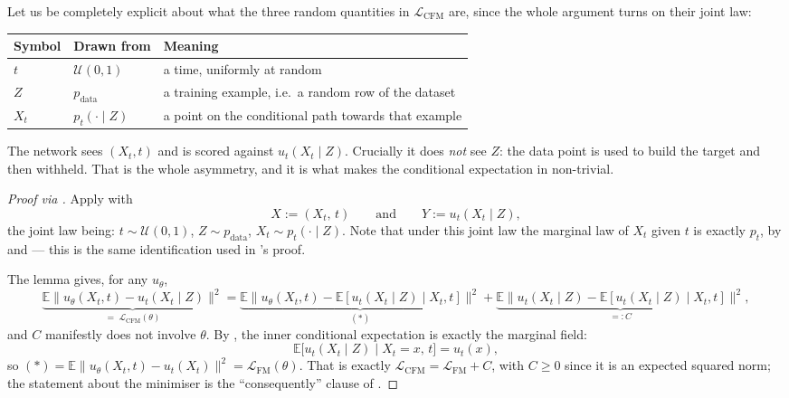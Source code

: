 \documentclass[11pt,a4paper]{report}
\theoremstyle{definition}
\theoremstyle{remark}
\newcommand{\EE}{\mathbb E}
\begin{document}
Let us be completely explicit about what the three random quantities in
$\mathcal L_{\mathrm{CFM}}$ are, since the whole argument turns on their
joint law:

\begin{center}
\begin{tabular}{llp{7.4cm}}
\toprule
Symbol & Drawn from & Meaning \\
\midrule
$t$ & $\mathcal U(0,1)$ & a time, uniformly at random \\
$Z$ & $p_{\mathrm{data}}$ & a training example, i.e.\ a random row of the dataset \\
$X_t$ & $p_t(\cdot\mid Z)$ & a point on the conditional path towards that example \\
\bottomrule
\end{tabular}
\end{center}

The network sees $(X_t,t)$ and is scored against $u_t(X_t\mid Z)$. Crucially
it does \emph{not} see $Z$: the data point is used to build the target and
then withheld. That is the whole asymmetry, and it is what makes the
conditional expectation in  non-trivial.

\begin{proof}[Proof via ]
Apply  with
\[
X := (X_t,\,t)
\qquad\text{and}\qquad
Y := u_t(X_t\mid Z) ,
\]
the joint law being: $t\sim\mathcal U(0,1)$, $Z\sim p_{\mathrm{data}}$,
$X_t\sim p_t(\cdot\mid Z)$. Note that under this joint law the marginal law
of $X_t$ given $t$ is exactly $p_t$, by  and
 --- this is the same identification used in
's proof.

The lemma gives, for any $u_\theta$,
\[
\underbrace{\EE\bigl\|u_\theta(X_t,t)-u_t(X_t\mid Z)\bigr\|^2}_{=\;\mathcal L_{\mathrm{CFM}}(\theta)}
=
\underbrace{\EE\bigl\|u_\theta(X_t,t)-\EE[u_t(X_t\mid Z)\mid X_t,t]\bigr\|^2}_{(\ast)}
+
\underbrace{\EE\bigl\|u_t(X_t\mid Z)-\EE[u_t(X_t\mid Z)\mid X_t,t]\bigr\|^2}_{=:C} ,
\]
and $C$ manifestly does not involve $\theta$. By
, the inner conditional expectation is
exactly the marginal field:
\[
\EE\bigl[u_t(X_t\mid Z)\;\big|\;X_t=x,\,t\bigr] = u_t(x) ,
\]
so $(\ast) = \EE\|u_\theta(X_t,t)-u_t(X_t)\|^2 = \mathcal L_{\mathrm{FM}}(\theta)$.
That is exactly
$\mathcal L_{\mathrm{CFM}} = \mathcal L_{\mathrm{FM}} + C$, with $C\ge0$
since it is an expected squared norm; the statement about
the minimiser is the ``consequently'' clause of .
\end{proof}
\end{document}
